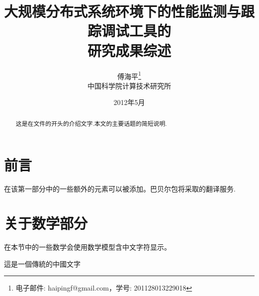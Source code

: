 \documentclass{ctexart}
\begin{document}
\title{大规模分布式系统环境下的性能监测与跟踪调试工具的\\研究成果综述}
\author{傅海平\footnote{电子邮件: haipingf@gmail.com，学号: 201128013229018}\\[2ex]
\xiaosihao 中国科学院计算技术研究所\\[2ex]
}
\date{2012年5月}
\tableofcontents

\begin{abstract}
这是在文件的开头的介绍文字.本文的主要话题的简短说明.
\end{abstract}

\section{ 前言 }
在该第一部分中的一些额外的元素可以被添加。巴贝尔包将采取的翻译服务.

\section{关于数学部分}
在本节中的一些数学会使用数学模型含中文字符显示。

這是一個傳統的中國文字
\end{document}
